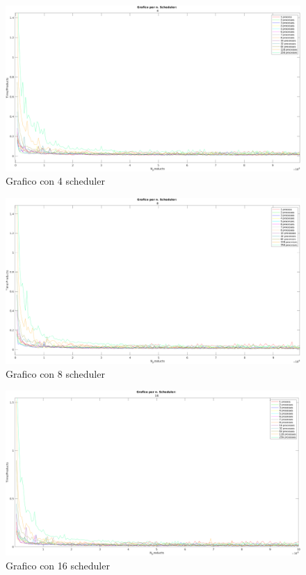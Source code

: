 \begin{figure}[!htp]
    \centering
    \includegraphics[keepaspectratio=true,scale=0.335]{images/matlab/4_scheduler.png}
	\caption{Grafico con 4 scheduler}
  	\label{fig:4_scheduler}
\end{figure}

\begin{figure}[!htp]
    \centering
    \includegraphics[keepaspectratio=true,scale=0.335]{images/matlab/8_scheduler.png}
	\caption{Grafico con 8 scheduler}
  	\label{fig:8_scheduler}
\end{figure}

\begin{figure}[!htp]
    \centering
    \includegraphics[keepaspectratio=true,scale=0.335]{images/matlab/16_scheduler.png}
	\caption{Grafico con 16 scheduler}
  	\label{fig:16_scheduler}
\end{figure}

